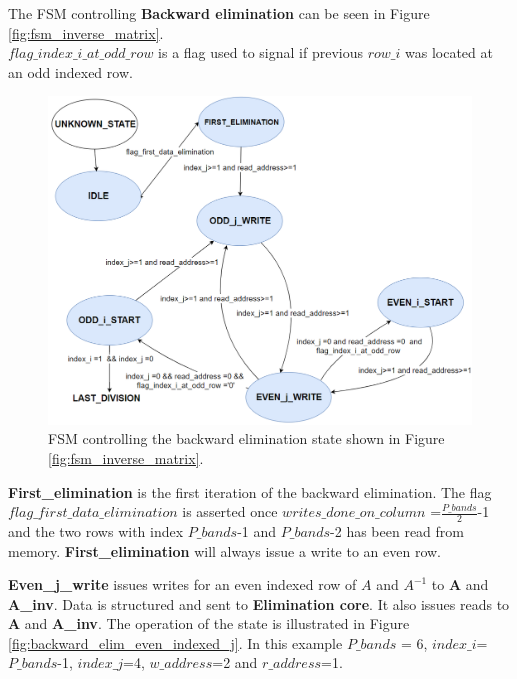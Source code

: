 The FSM controlling \textbf{Backward elimination} can be seen in Figure \ref{fig:fsm_inverse_matrix}.\\ $flag\_index\_i\_at\_odd\_row$ is a flag used to signal if previous $row\_i$ was located at an odd indexed row. 

\begin{figure}[H]
\centering
   \includegraphics[scale=0.4]{images/inverse_hw/fsm_backward_elimination.PNG}
  \caption{FSM controlling the backward elimination state shown in Figure \ref{fig:fsm_inverse_matrix}.  } 
  \label{fig:fsm_backward_elimination}
\end{figure}



\textbf{First\_elimination} is the first iteration of the backward elimination. The flag $flag\_first\_data\_elimination$ is asserted once $writes\_done\_on\_column$ =$\frac{P\_bands}{2}$-1 and the two rows with index $P\_bands$-1 and $P\_bands$-2 has been read from memory. \textbf{First\_elimination} will always issue a write to an even row. 

\textbf{Even\_j\_write} issues writes for an even indexed row of $A$ and $A^{-1}$ to \textbf{A} and \textbf{A\_inv}. Data is structured and sent to \textbf{Elimination core}. It also issues reads to \textbf{A} and \textbf{A\_inv}. The operation of the state is illustrated in Figure \ref{fig:backward_elim_even_indexed_j}. In this example $P\_bands$ = 6, $index\_i$=$P\_bands$-1, $index\_j$=4, $w\_address$=2 and $r\_address$=1. 

